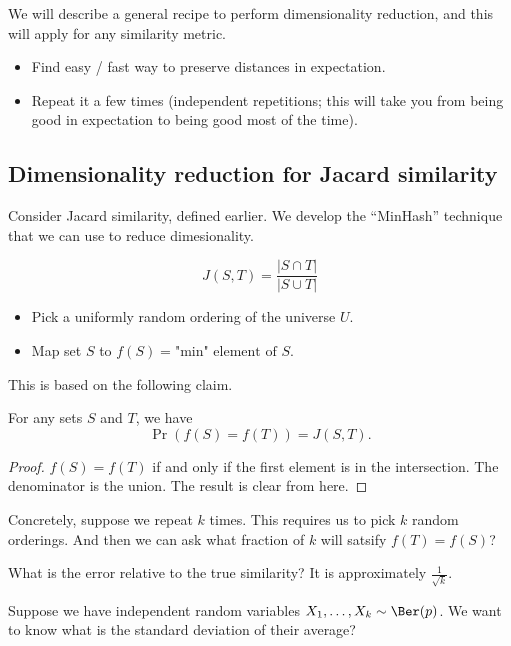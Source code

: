 We will describe a general recipe to perform dimensionality reduction, and this will apply for any similarity metric.

\begin{itemize}
  \item Find easy / fast way to preserve distances in expectation.
  \item Repeat it a few times (independent repetitions; this will take you from being good in expectation to being good most of the time).
\end{itemize}

\subsection{Dimensionality reduction for Jacard similarity}

Consider Jacard similarity, defined earlier.  We develop the ``MinHash'' technique that we can use to reduce dimesionality.

\[
  J(S, T) = \frac{|S \cap T|}{|S \cup T|}
\]

\begin{itemize}
  \item Pick a uniformly random ordering of the universe $U$.
  \item Map set $S$ to $f(S) = \text{"min" element of $S$}$.
\end{itemize}

This is based on the following claim. \\

\begin{claim}
  For any sets $S$ and $T$, we have
  \[
    \Pr(f(S) = f(T)) =J(S, T).
  \]
\end{claim}

\begin{proof}
$f(S) = f(T)$ if and only if the first element is in the intersection.  The denominator is the union.  The result is clear from here.
\end{proof}

Concretely, suppose we repeat $k$ times.  This requires us to pick $k$ random orderings.  And then we can ask what fraction of $k$ will satsify $f(T) = f(S)$?

What is the error relative to the true similarity?  It is approximately $\frac{1}{\sqrt{k}}$.

Suppose we have independent random variables $X_1, \dots, X_k \sim \Ber(p)$.  We want to know what is the standard deviation of their average?

